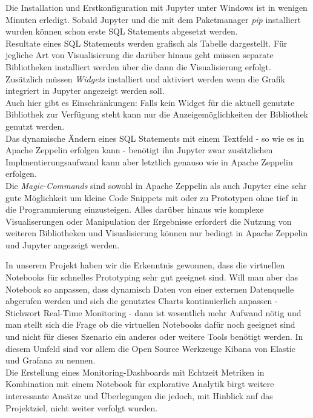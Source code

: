 Die Installation und Erstkonfiguration mit Jupyter unter Windows ist in wenigen Minuten erledigt.
Sobald Jupyter und die  mit dem Paketmanager \textit{pip} installiert wurden können
schon erste \ac{SQL} Statements abgesetzt werden.\\
Resultate eines \ac{SQL} Statements werden grafisch als Tabelle dargestellt.
Für jegliche Art von Visualisierung die darüber hinaus geht müssen separate Bibliotheken installiert werden
über die dann die Visualisierung erfolgt.
Zusätzlich müssen \textit{Widgets} installiert und aktiviert werden wenn die Grafik integriert in Jupyter angezeigt werden soll.\\
Auch hier gibt es Einschränkungen: Falls kein Widget für die aktuell genutzte Bibliothek zur Verfügung steht kann nur die Anzeigemöglichkeiten der Bibliothek genutzt werden.\\
Das dynamische Ändern eines \ac{SQL} Statements mit einem Textfeld - so wie es in Apache Zeppelin erfolgen kann - benötigt ihn Jupyter zwar zusätzlichen Implmentierungsaufwand kann aber letztlich genauso wie in Apache Zeppelin erfolgen.\\
Die \textit{Magic-Commands} sind sowohl in Apache Zeppelin als auch Jupyter eine sehr gute Möglichkeit um kleine Code Snippets mit  oder  zu Prototypen ohne tief in die Programmierung einzusteigen.
Alles darüber hinaus wie komplexe Visualiserungen oder Manipulation der Ergebnisse erfordert die Nutzung von weiteren Bibliotheken und
Visualisierung können nur bedingt in Apache Zeppelin und Jupyter angezeigt werden.

In unserem Projekt haben wir die Erkenntnis gewonnen, dass die virtuellen Notebooks für schnelles Prototyping sehr gut geeignet sind.
Will man aber das Notebook so anpassen, dass \zb{} dynamisch Daten von einer externen Datenquelle abgerufen werden
und sich die genutztes Charts kontinuierlich anpassen - Stichwort Real-Time Monitoring - dann ist wesentlich mehr Aufwand nötig und man stellt sich die
Frage ob die virtuellen Notebooks dafür noch geeignet sind und nicht für dieses Szenario ein anderes oder weitere Tools benötigt werden. In diesem Umfeld sind vor allem die Open Source Werkzeuge Kibana von Elastic und Grafana zu nennen.\\
Die Erstellung eines Monitoring-Dashboards mit Echtzeit Metriken in Kombination mit einem Notebook für explorative Analytik birgt weitere interessante Ansätze und Überlegungen die
jedoch, mit Hinblick auf das Projektziel, nicht weiter verfolgt wurden.
